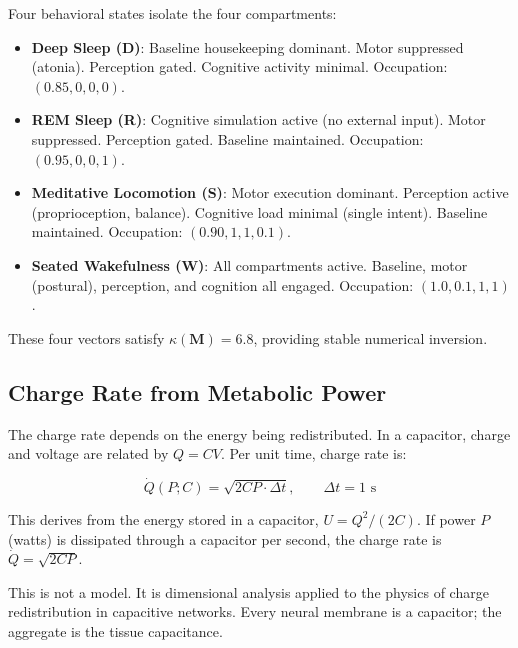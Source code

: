 \begin{definition}
\label{def:orthogonal-states}
Four behavioral states isolate the four compartments:

\begin{itemize}
\item \textbf{Deep Sleep (D)}: Baseline housekeeping dominant. Motor suppressed (atonia). Perception gated. Cognitive activity minimal. Occupation: $(0.85, 0, 0, 0)$.

\item \textbf{REM Sleep (R)}: Cognitive simulation active (no external input). Motor suppressed. Perception gated. Baseline maintained. Occupation: $(0.95, 0, 0, 1)$.

\item \textbf{Meditative Locomotion (S)}: Motor execution dominant. Perception active (proprioception, balance). Cognitive load minimal (single intent). Baseline maintained. Occupation: $(0.90, 1, 1, 0.1)$.

\item \textbf{Seated Wakefulness (W)}: All compartments active. Baseline, motor (postural), perception, and cognition all engaged. Occupation: $(1.0, 0.1, 1, 1)$.
\end{itemize}

These four vectors satisfy $\kappa(\mathbf{M}) = 6.8$, providing stable numerical inversion.
\end{definition}

\subsection{Charge Rate from Metabolic Power}

The charge rate depends on the energy being redistributed. In a capacitor, charge and voltage are related by $Q = CV$. Per unit time, charge rate is:

\begin{equation}
\dot{Q}(P; C) = \sqrt{2CP \cdot \Delta t},\qquad \Delta t = 1\text{ s}
\end{equation}

This derives from the energy stored in a capacitor, $U = Q^2/(2C)$. If power $P$ (watts) is dissipated through a capacitor per second, the charge rate is $\dot{Q} = \sqrt{2CP}$.

\begin{remark}
This is not a model. It is dimensional analysis applied to the physics of charge redistribution in capacitive networks. Every neural membrane is a capacitor; the aggregate is the tissue capacitance.
\end{remark}

